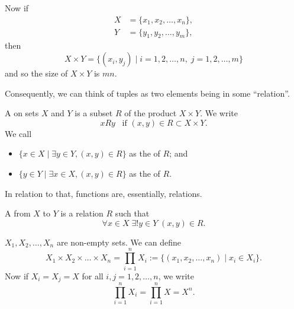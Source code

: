 \documentclass[notoc,notitlepage]{tufte-book}
\begin{document}
\begin{note}
  Now if
  \begin{align*}
    X &= \{ x_1, x_2, \ldots, x_n \}, \\
    Y &= \{ y_1, y_2, \ldots, y_m \},
  \end{align*}
  then
  \begin{equation*}
    X \times Y = \{ (x_i, y_j) \mid i = 1, 2, \ldots, n, \; j = 1, 2, \ldots, m \}
  \end{equation*}
  and so the size of $X \times Y$ is $mn$.
\end{note}

Consequently, we can think of tuples as two elements being in some ``relation''.

\begin{defn}[Relation]\label{defn:relation}
  A  on sets $X$ and $Y$ is a subset $R$ of the product $X \times Y$. We write
  \begin{equation*}
    xRy \enspace \text{ if } (x, y) \in R \subset X \times Y.
  \end{equation*}
  We call
  \begin{itemize}
    \item $\{ x \in X \mid \exists y \in Y, (x, y) \in R \}$ as the  of $R$; and 
    \item $\{ y \in Y \mid \exists x \in X, (x, y) \in R \}$ as the  of $R$.
  \end{itemize}
\end{defn}

In relation to that, functions are, essentially, relations.

\begin{defn}[Function]\label{defn:function}
  A  from $X$ to $Y$ is a relation $R$ such that
  \begin{equation*}
    \forall x \in X \; \exists! y \in Y \; (x, y) \in R.
  \end{equation*}
\end{defn}

 $X_1, X_2, \ldots, X_n$ are non-empty sets. We can define
\begin{equation*}
  X_1 \times X_2 \times \hdots \times X_n = \prod_{i=1}^{n} X_i := \{ (x_1, x_2, \ldots, x_n) \mid x_i \in X_i \}.
\end{equation*}
Now if $X_i = X_j = X$ for all $i, j = 1, 2, \ldots, n$, we write
\begin{equation*}
  \prod_{i=1}^{n} X_i = \prod_{i=1}^{n} X = X^n.
\end{equation*}
\end{document}

